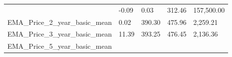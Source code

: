 \documentclass[]{article}
\begin{document}
\begin{longtable}[]{@{}lllll@{}}
\begin{minipage}[t]{0.49\columnwidth}
\end{minipage} & \begin{minipage}[t]{0.08\columnwidth}\raggedright\strut
-0.09\strut
\end{minipage} & \begin{minipage}[t]{0.09\columnwidth}\raggedright\strut
0.03\strut
\end{minipage} & \begin{minipage}[t]{0.09\columnwidth}\raggedright\strut
312.46\strut
\end{minipage} & \begin{minipage}[t]{0.11\columnwidth}\raggedright\strut
157,500.00\strut
\end{minipage}\tabularnewline
\begin{minipage}[t]{0.49\columnwidth}\raggedright\strut
EMA\_Price\_2\_year\_basic\_mean\strut
\end{minipage} & \begin{minipage}[t]{0.08\columnwidth}\raggedright\strut
0.02\strut
\end{minipage} & \begin{minipage}[t]{0.09\columnwidth}\raggedright\strut
390.30\strut
\end{minipage} & \begin{minipage}[t]{0.09\columnwidth}\raggedright\strut
475.96\strut
\end{minipage} & \begin{minipage}[t]{0.11\columnwidth}\raggedright\strut
2,259.21\strut
\end{minipage}\tabularnewline
\begin{minipage}[t]{0.49\columnwidth}\raggedright\strut
EMA\_Price\_3\_year\_basic\_mean\strut
\end{minipage} & \begin{minipage}[t]{0.08\columnwidth}\raggedright\strut
11.39\strut
\end{minipage} & \begin{minipage}[t]{0.09\columnwidth}\raggedright\strut
393.25\strut
\end{minipage} & \begin{minipage}[t]{0.09\columnwidth}\raggedright\strut
476.45\strut
\end{minipage} & \begin{minipage}[t]{0.11\columnwidth}\raggedright\strut
2,136.36\strut
\end{minipage}\tabularnewline
\begin{minipage}[t]{0.49\columnwidth}\raggedright\strut
EMA\_Price\_5\_year\_basic\_mean\strut

\end{minipage}
\end{longtable}
\end{document}
